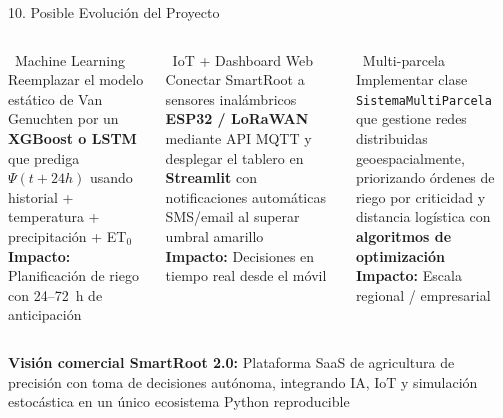 \documentclass[11pt, aspectratio=169]{beamer}
\begin{document}
\begin{frame}{10. Posible Evolución del Proyecto}

\begin{columns}[t]
\begin{block}{\small\faRobot\ Machine Learning}
\footnotesize
Reemplazar el modelo estático de Van Genuchten por un \textbf{XGBoost o LSTM} que prediga $\Psi(t+24h)$ usando historial + temperatura + precipitación + ET$_0$\\[4pt]
\textbf{Impacto:} Planificación de riego con 24--72~h de anticipación
\end{block}

\begin{exampleblock}{\small\faCloud\ IoT + Dashboard Web}
\footnotesize
Conectar SmartRoot a sensores inalámbricos \textbf{ESP32 / LoRaWAN} mediante API MQTT y desplegar el tablero en \textbf{Streamlit} con notificaciones automáticas SMS/email al superar umbral amarillo\\[4pt]
\textbf{Impacto:} Decisiones en tiempo real desde el móvil
\end{exampleblock}

\begin{alertblock}{\small\faSeedling\ Multi-parcela}
\footnotesize
Implementar clase \texttt{SistemaMultiParcela} que gestione redes distribuidas geoespacialmente, priorizando órdenes de riego por criticidad y distancia logística con \textbf{algoritmos de optimización}\\[4pt]
\textbf{Impacto:} Escala regional / empresarial
\end{alertblock}
\end{columns}

\vspace{8pt}
\begin{tcolorbox}[colback=SmartBlue!8,colframe=SmartBlue!40,
    arc=4pt,left=8pt,right=8pt,top=4pt,bottom=4pt]
\centering\small
\textbf{Visión comercial SmartRoot 2.0:}
Plataforma SaaS de agricultura de precisión con toma de decisiones autónoma,
integrando IA, IoT y simulación estocástica en un único ecosistema Python reproducible
\end{tcolorbox}
\end{frame}
\end{document}
